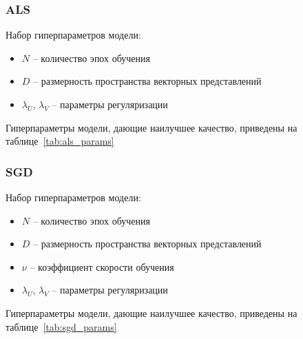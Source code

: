 \subsubsection{ALS}
Набор гиперпараметров модели:
\begin{itemize}
    \item $N$ -- количество эпох обучения
    \item $D$ -- размерность пространства векторных представлений
    \item $\lambda_{U}$, $\lambda_{V}$ -- параметры регуляризации
\end{itemize}

Гиперпараметры модели, дающие наилучшее качество, приведены на таблице~\ref{tab:als_params}
\begin{table}[h]
    \caption{Гиперпараметры ALS}
    \label{tab:als_params}
\end{table}

\pagebreak
\subsubsection{SGD}
Набор гиперпараметров модели:
\begin{itemize}
    \item $N$ -- количество эпох обучения
    \item $D$ -- размерность пространства векторных представлений
    \item $\nu$ -- коэффициент скорости обучения
    \item $\lambda_{U}$, $\lambda_{V}$ -- параметры регуляризации
\end{itemize}

Гиперпараметры модели, дающие наилучшее качество, приведены на таблице~\ref{tab:sgd_params}
\begin{table}[h]
    \caption{Гиперпараметры SGD}
    \label{tab:sgd_params}
\end{table}


